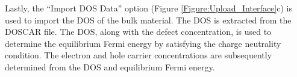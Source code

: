 \documentclass[%
 reprint,
 amsmath,amssymb,
 aps,
]{revtex4-1}
\begin{document}
Lastly, the ``Import DOS Data'' option (Figure \ref{Figure:Upload_Interface}c) is used to import the DOS of the bulk material. The DOS is extracted from the DOSCAR file. The DOS, along with the defect concentration, is used to determine the equilibrium Fermi energy by satisfying the charge neutrality condition. The electron and hole carrier concentrations are subsequently determined from the DOS and equilibrium Fermi energy.

\end{document}
